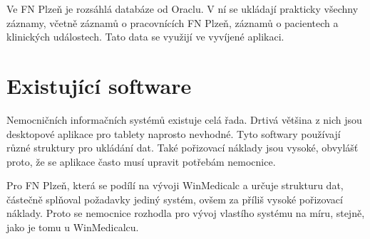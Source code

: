 Ve FN Plzeň je rozsáhlá databáze od Oraclu. V ní se ukládají prakticky všechny záznamy, včetně záznamů o pracovnících FN Plzeň, záznamů o pacientech a klinických událostech. Tato data se využijí ve vyvíjené aplikaci.

\section{Existující software}

Nemocničních informačních systémů existuje celá řada. Drtivá většina z nich jsou desktopové aplikace pro tablety naprosto nevhodné. Tyto softwary používají různé struktury pro ukládání dat. Také pořizovací náklady jsou vysoké, obvylášť proto, že se aplikace často musí upravit potřebám nemocnice.

Pro FN Plzeň, která se podílí na vývoji WinMedicalc a určuje strukturu dat, částečně splňoval požadavky jediný systém, ovšem za příliš vysoké pořizovací náklady. Proto se nemocnice rozhodla pro vývoj vlastího systému na míru, stejně, jako je tomu u WinMedicalcu.